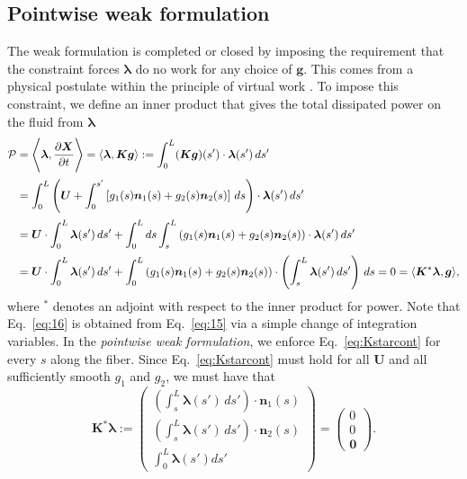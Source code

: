 \subsection{Pointwise weak formulation}
The weak formulation is completed or closed by imposing the requirement that the constraint forces $\bm{\lambda}$ do no work for any choice of $\bm{g}$. This comes from a physical postulate within the principle of virtual work \cite{varibook}. To impose this constraint, we define an inner product that gives the total dissipated power on the fluid from $\bm{\lambda}$
\begin{align}
\label{eq:powerip}
\mathcal{P}& =\Bigg{\langle} \boldsymbol{\lambda},\frac{\partial \boldsymbol{X}}{\partial t} \Bigg{\rangle} = \langle \boldsymbol{\lambda},\boldsymbol{K}\boldsymbol{g} \rangle := \int_0^L (\boldsymbol{K}\boldsymbol{g})(s') \cdot \boldsymbol{\lambda}(s') \, ds'\\[2 pt] 
\label{eq:15}
& = \int_0^L \left(\boldsymbol{U}+\int_0^{s'} \left[g_1(s) \boldsymbol{n}_1(s) + g_2(s) \boldsymbol{n}_2(s)\right]\,ds\right) \cdot \boldsymbol{\lambda}(s') \, ds'\\[2 pt] 
\label{eq:16}
& = \boldsymbol{U} \cdot \int_0^L \boldsymbol{\lambda}(s') \, ds' +\int _0^L ds \int_{s}^L \left(g_1(s)\boldsymbol{n}_1(s) + g_2(s) \boldsymbol{n}_2(s) \right) \cdot \boldsymbol{\lambda}(s') \, ds'\\[2 pt]
\label{eq:Kstarcont}
& = \boldsymbol{U} \cdot \int_0^L \boldsymbol{\lambda}(s') \, ds' + \int_0^L \left(g_1(s)\boldsymbol{n}_1(s) + g_2(s) \boldsymbol{n}_2(s) \right) \cdot  \left(\int_{s}^L  \boldsymbol{\lambda}(s') \, ds'\right) \, ds=0=\langle\boldsymbol{K}^*\boldsymbol{\lambda},\boldsymbol{g}\rangle, 
\end{align}
where $^*$ denotes an adjoint with respect to the inner product for power. Note that Eq.\ \eqref{eq:16} is obtained from Eq.\ \eqref{eq:15} via a simple change of integration variables. In the \textit{pointwise weak formulation}, we enforce Eq.\ \eqref{eq:Kstarcont} for every $s$ along the fiber. Since Eq.\ \eqref{eq:Kstarcont} must hold for all $\bm{U}$ and all sufficiently smooth $g_1$ and $g_2$, we must have that
\begin{equation}
\label{eq:noworkcont}
\bm{K}^* \bm{\lambda}:=\begin{pmatrix} \left(\int_s^L \bm{\lambda}(s')\, ds'\right) \cdot \bm{n}_1(s)\\[2 pt] \left(\int_s^L \bm{\lambda}(s')\, ds'\right) \cdot \bm{n}_2(s)\\[2 pt] \int_0^L \bm{\lambda}(s') ds' \end{pmatrix} = \begin{pmatrix} 0 \\[2 pt] 0\\[2 pt] \bm{0}\end{pmatrix}. 
\end{equation}

